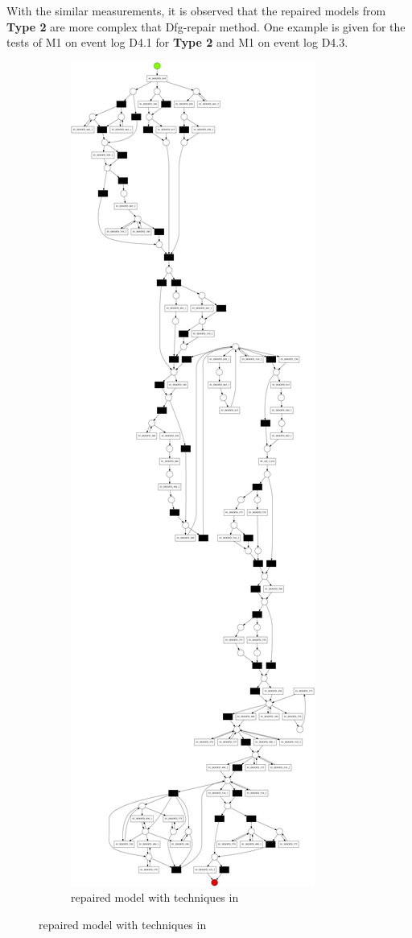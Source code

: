 With the similar measurements, it is observed that the repaired models from \textbf{Type 2} are more complex that Dfg-repair method. One example is given for the tests of M1 on event log D4.1 for \textbf{Type 2} and M1 on event log D4.3. 
\begin{figure}[h]
	\centering
	\begin{subfigure}[b]{0.48\textwidth}
		\centering
		\includegraphics[width=0.5\linewidth, height=0.7\textheight]{figures/evaluation/PN-result-D5-3-M1-fahland.pdf}
		\caption{repaired model with techniques in \cite{fahland2015model}}
		\label{fig:model_fahland}

\end{subfigure}
\end{figure}
